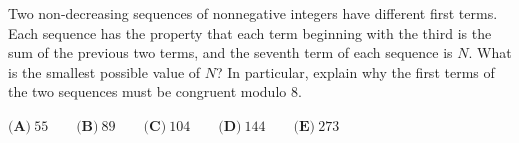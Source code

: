 Two non-decreasing sequences of nonnegative integers have different first terms. Each sequence has the property that each term beginning with the third is the sum of the previous two terms, and the seventh term of each sequence is $N$. What is the smallest possible value of $N$? In particular, explain why the first terms of the two sequences must be congruent modulo $8$.

$\textbf{(A)}\ 55\qquad\textbf{(B)}\ 89\qquad\textbf{(C)}\ 104\qquad\textbf{(D)}\ 144\qquad\textbf{(E)}\ 273$
